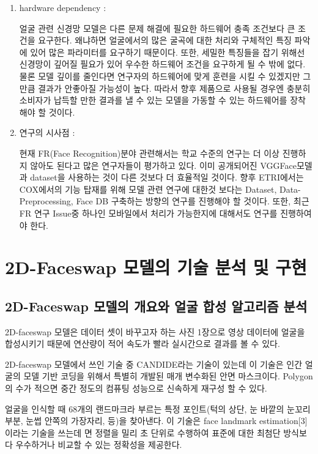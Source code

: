 \documentclass{oblivoir}
\begin{document}
\begin{enumerate}
    \item hardware dependency : 

    얼굴 관련 신경망 모델은 다른 문제 해결에 필요한 하드웨어 충족 조건보다 큰 조건을 요구한다. 왜냐하면 얼굴에서의 많은 굴곡에 대한 처리와 구체적인 특징 파악에 있어 많은 파라미터를 요구하기 때문이다. 또한, 세밀한 특징들을 잡기 위해선 신경망이 깊어질 필요가 있어 우수한 하드웨어 조건을 요구하게 될 수 밖에 없다. 물론 모델 깊이를 줄인다면 연구자의 하드웨어에 맞게 훈련을 시킬 수 있겠지만 그만큼 결과가 안좋아질 가능성이 높다. 따라서 향후 제품으로 사용될 경우엔 충분히 소비자가 납득할 만한 결과를 낼 수 있는 모델을 가동할 수 있는 하드웨어를 장착해야 할 것이다. 

    \item 연구의 시사점 : 

    현재 FR(Face Recognition)분야 관련해서는 학교 수준의 연구는 더 이상 진행하지 않아도 된다고 많은 연구자들이 평가하고 있다. 이미 공개되어진 VGGFace모델과 dataset을 사용하는 것이 다른 것보다 더 효율적일 것이다. 향후 ETRI에서는 COX에서의 기능 탑재를 위해 모델 관련 연구에 대한것 보다는 Dataset, Data-Preprocessing, Face DB 구축하는 방향의 연구를 진행해야 할 것이다. 또한, 최근 FR 연구 Issue중 하나인 모바일에서 처리가 가능한지에 대해서도 연구를 진행하여야 한다.
        
\end{enumerate}

\chapter{ 2D-Faceswap 모델의 기술 분석 및 구현 }

\section{2D-Faceswap 모델의 개요와 얼굴 합성 알고리즘 분석}

2D-faceswap 모델은 데이터 셋이 바꾸고자 하는 사진 1장으로 영상 데이터에 얼굴을 합성시키기 때문에 연산량이 적어 속도가 빨라 실시간으로 결과를 볼 수 있다. 

2D-faceswap 모델에서 쓰인 기술 중 CANDIDE라는 기술이 있는데 이 기술은 인간 얼굴의 모델 기반 코딩을 위해서 특별히 개발된 매개 변수화된 안면 마스크이다. Polygon의 수가 적으면 중간 정도의 컴퓨팅 성능으로 신속하게 재구성 할 수 있다.

얼굴을 인식할 때 68개의 랜드마크라 부르는 특정 포인트(턱의 상단, 눈 바깥의 눈꼬리부분, 눈썹 안쪽의 가장자리, 등)을 찾아낸다. 이 기술은 face landmark estimation[3]이라는 기술을 쓰는데 면 정렬을 밀리 초 단위로 수행하여 표준에 대한 최첨단 방식보다 우수하거나 비교할 수 있는 정확성을 제공한다. 
\end{document}
